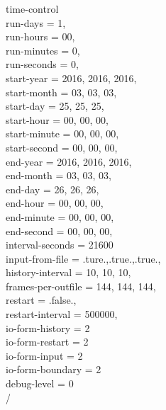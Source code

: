 \documentclass[a4paper,12pt]{article}
\numberwithin{equation}{section} %
\begin{document}
time-control\\
 run-days                            = 1,\\
 run-hours                           = 00,\\
 run-minutes                         = 0,\\
 run-seconds                         = 0,\\
 start-year                          = 2016, 2016, 2016,\\
 start-month                         = 03,   03,   03,\\
 start-day                           = 25,   25,   25,\\
 start-hour                          = 00,   00,   00,\\
 start-minute                        = 00,   00,   00,\\
 start-second                        = 00,   00,   00,\\
 end-year                            = 2016, 2016, 2016,\\
 end-month                           = 03,   03,   03,\\
 end-day                             = 26,   26,   26,\\
 end-hour                            = 00,   00,   00,\\
 end-minute                          = 00,   00,   00,\\
 end-second                          = 00,   00,   00,\\
 interval-seconds                    = 21600\\
 input-from-file                     = .ture.,.true.,.true.,\\
 history-interval                    = 10,  10,   10,\\
 frames-per-outfile                  = 144, 144, 144,\\
 restart                             = .false.,\\
 restart-interval                    = 500000,\\
 io-form-history                     = 2\\
 io-form-restart                     = 2\\
 io-form-input                       = 2\\
 io-form-boundary                    = 2\\
 debug-level                         = 0\\
 /\\
\end{document}
